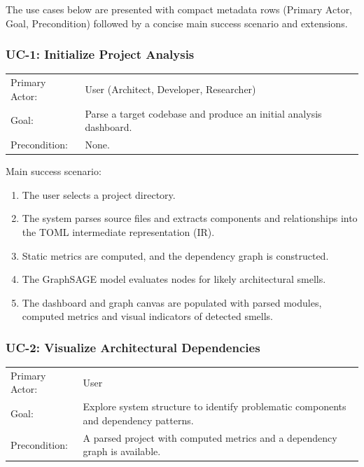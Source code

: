 The use cases below are presented with compact metadata rows (Primary Actor, Goal, Precondition) followed by a concise main success scenario and extensions.

\subsubsection{UC-1: Initialize Project Analysis}
\label{subsubsection:uc-1}
\begin{tabularx}{\textwidth}{@{}p{3.2cm}X@{}}
Primary Actor: & User (Architect, Developer, Researcher) \\
Goal: & Parse a target codebase and produce an initial analysis dashboard. \\
Precondition: & None. \\
\end{tabularx}

Main success scenario:
\begin{enumerate}
    \item The user selects a project directory.
    \item The system parses source files and extracts components and relationships into the TOML intermediate representation (IR).
    \item Static metrics are computed, and the dependency graph is constructed.
    \item The GraphSAGE model evaluates nodes for likely architectural smells.
    \item The dashboard and graph canvas are populated with parsed modules, computed metrics and visual indicators of detected smells.
\end{enumerate}

\subsubsection{UC-2: Visualize Architectural Dependencies}
\label{subsubsection:uc-2}
\begin{tabularx}{\textwidth}{@{}p{3.2cm}X@{}}
Primary Actor: & User \\
Goal: & Explore system structure to identify problematic components and dependency patterns. \\
Precondition: & A parsed project with computed metrics and a dependency graph is available. \\
\end{tabularx}

